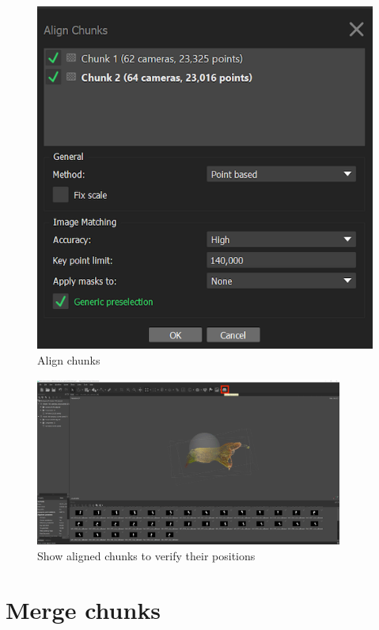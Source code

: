 \documentclass[
]{book}
\theoremstyle{definition}
\theoremstyle{definition}
\theoremstyle{definition}
\theoremstyle{definition}
\theoremstyle{remark}
\begin{document}
\begin{figure}
\hypertarget{Align_chunk}{%
\centering
\includegraphics[width=1\textwidth,height=\textheight]{Figures/metashape_align_chunks.png}
\caption{Align chunks}\label{Align_chunk}
}
\end{figure}

\begin{figure}
\hypertarget{show_aligned_chunk}{%
\centering
\includegraphics[width=0.9\textwidth,height=\textheight]{Figures/metashape_show_aligned_chunks.png}
\caption{Show aligned chunks to verify their
positions}\label{show_aligned_chunk}
}
\end{figure}

\hypertarget{merge-chunks}{%
\section{Merge chunks}\label{merge-chunks}}
\end{document}
